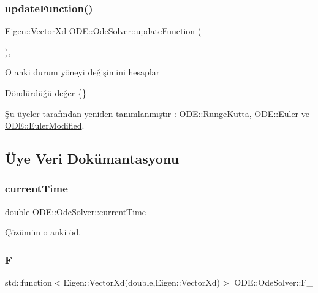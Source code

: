 \subsubsection{\texorpdfstring{updateFunction()}{updateFunction()}}
{\footnotesize\ttfamily Eigen\+::\+Vector\+Xd O\+D\+E\+::\+Ode\+Solver\+::update\+Function (\begin{DoxyParamCaption}{ }\end{DoxyParamCaption})\hspace{0.3cm}{\ttfamily [protected]}, {\ttfamily [virtual]}}

O anki durum yöneyi değişimini hesaplar \begin{DoxyReturn}{Döndürdüğü değer}
\{\} 
\end{DoxyReturn}


Şu üyeler tarafından yeniden tanımlanmıştır \+: \mbox{\hyperlink{classODE_1_1RungeKutta_a545126adbad4dcf9294cc2623117edab}{O\+D\+E\+::\+Runge\+Kutta}}, \mbox{\hyperlink{classODE_1_1Euler_a8d8ea2d464ecbbcc7258eaf660f57903}{O\+D\+E\+::\+Euler}} ve \mbox{\hyperlink{classODE_1_1EulerModified_af318a33aabefccbf08f079d1d1600112}{O\+D\+E\+::\+Euler\+Modified}}.



\subsection{Üye Veri Dokümantasyonu}
\mbox{\label{classODE_1_1OdeSolver_a936afe9d8e5fef88dfba926a9d7144d2}} 
\subsubsection{\texorpdfstring{currentTime\_}{currentTime\_}}
{\footnotesize\ttfamily double O\+D\+E\+::\+Ode\+Solver\+::current\+Time\+\_\+\hspace{0.3cm}{\ttfamily [protected]}}



Çözümün o anki öd. 

\mbox{\label{classODE_1_1OdeSolver_a806b1ad1f9109867796a035423227831}} 
\subsubsection{\texorpdfstring{F\_}{F\_}}
{\footnotesize\ttfamily std\+::function$<$Eigen\+::\+Vector\+Xd(double,Eigen\+::\+Vector\+Xd)$>$ O\+D\+E\+::\+Ode\+Solver\+::\+F\+\_\+\hspace{0.3cm}{\ttfamily [protected]}}



